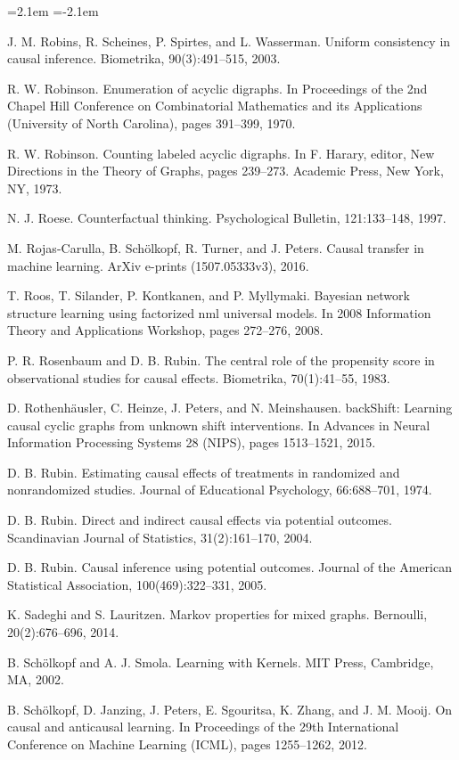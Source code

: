 \begin{list}{}{\leftmargin=2.1em
 \itemindent=-2.1em\parsep=0pt\itemsep=3pt}
\item J. M. Robins, R. Scheines, P. Spirtes, and L. Wasserman. Uniform consistency in causal inference. Biometrika, 90(3):491--515, 2003.
\item R. W. Robinson. Enumeration of acyclic digraphs. In Proceedings of the 2nd Chapel Hill Conference on Combinatorial Mathematics and its Applications (University of North Carolina), pages 391--399, 1970.
\item R. W. Robinson. Counting labeled acyclic digraphs. In F. Harary, editor, New Directions in the Theory of Graphs, pages 239--273. Academic Press, New York, NY, 1973.
\item N. J. Roese. Counterfactual thinking. Psychological Bulletin, 121:133--148, 1997.
\item M. Rojas-Carulla, B. Schölkopf, R. Turner, and J. Peters. Causal transfer in machine learning. ArXiv e-prints (1507.05333v3), 2016.
\item T. Roos, T. Silander, P. Kontkanen, and P. Myllymaki. Bayesian network structure learning using factorized nml universal models. In 2008 Information Theory and Applications Workshop, pages 272--276, 2008.
\item P. R. Rosenbaum and D. B. Rubin. The central role of the propensity score in observational studies for causal effects. Biometrika, 70(1):41--55, 1983.
\item D. Rothenhäusler, C. Heinze, J. Peters, and N. Meinshausen. backShift: Learning causal cyclic graphs from unknown shift interventions. In Advances in Neural Information Processing Systems 28 (NIPS), pages 1513--1521, 2015.
\item D. B. Rubin. Estimating causal effects of treatments in randomized and nonrandomized studies. Journal of Educational Psychology, 66:688--701, 1974.
\item D. B. Rubin. Direct and indirect causal effects via potential outcomes. Scandinavian Journal of Statistics, 31(2):161--170, 2004.
\item D. B. Rubin. Causal inference using potential outcomes. Journal of the American Statistical Association, 100(469):322--331, 2005.
\item K. Sadeghi and S. Lauritzen. Markov properties for mixed graphs. Bernoulli, 20(2):676--696, 2014.
\item B. Schölkopf and A. J. Smola. Learning with Kernels. MIT Press, Cambridge, MA, 2002.
\item B. Schölkopf, D. Janzing, J. Peters, E. Sgouritsa, K. Zhang, and J. M. Mooij. On causal and anticausal learning. In Proceedings of the 29th International Conference on Machine Learning (ICML), pages 1255--1262, 2012.

\end{list}
